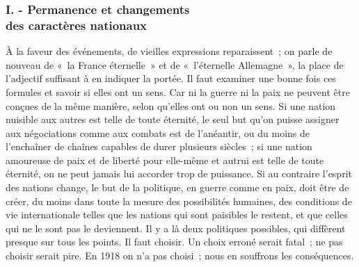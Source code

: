 \documentclass[french,twoside]{book} %
\begin{document}
\subsubsection[{I. - Permanence et changements, des caractères nationaux}]{I. - Permanence et changements \\
des caractères nationaux}
\noindent \par
À la faveur des événements, de vieilles expressions reparaissent ; on parle de nouveau de « la France éternelle » et de « l'éternelle Allemagne », la place de l'adjectif suffisant à en indiquer la portée. Il faut examiner une bonne fois ces formules et savoir si elles ont un sens. Car ni la guerre ni la paix ne peuvent être conçues de la même manière, selon qu'elles ont ou non un sens. Si une nation nuisible aux autres est telle de toute éternité, le seul but qu'on puisse assigner aux négociations comme aux combats est de l'anéantir, ou du moins de l'enchaîner de chaînes capables de durer plusieurs siècles ; si une nation amoureuse de paix et de liberté pour elle-même et autrui est telle de toute éternité, on ne peut jamais lui accorder trop de puissance. Si au contraire l'esprit des nations change, le but de la politique, en guerre comme en paix, doit être de créer, du moins dans toute la mesure des possibilités humaines, des conditions de vie internationale telles que les nations qui sont paisibles le restent, et que celles qui ne le sont pas le deviennent. Il y a là deux politiques possibles, qui diffèrent presque sur tous les points. Il faut choisir. Un choix erroné serait fatal ; ne pas choisir serait pire. En 1918 on n'a pas choisi ; nous en souffrons les conséquences.\par
\end{document}
